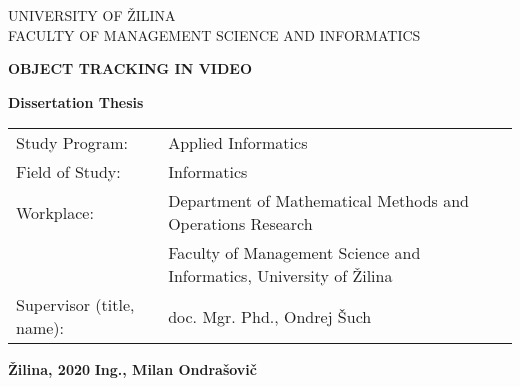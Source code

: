 \begin{titlepage}
    \begin{center}
        \vspace*{1cm} %
        
        \LARGE
        UNIVERSITY OF ŽILINA\\
        \Large
        FACULTY OF MANAGEMENT SCIENCE AND INFORMATICS\\
        
        \vspace{6cm}
        
        \LARGE
        \textbf{OBJECT TRACKING IN VIDEO}
        
        \vspace{1cm}
        
        \textbf{Dissertation Thesis}
    \end{center}
    
    \vspace{2cm}
    
    \vfill
    
    \normalsize
    
    \begin{tabular}{ll}
        Study Program: & Applied Informatics\\
        Field of Study: & Informatics \\
        Workplace: & Department of Mathematical Methods and Operations Research\\
                  & Faculty of Management Science and Informatics, University of Žilina\\
        Supervisor (title, name): & doc. Mgr. Phd., Ondrej Šuch\\
    \end{tabular}
    
    \vspace{2cm}
    
    \textbf{Žilina, 2020} \hfill \textbf{Ing., Milan Ondrašovič}
    
\end{titlepage}
